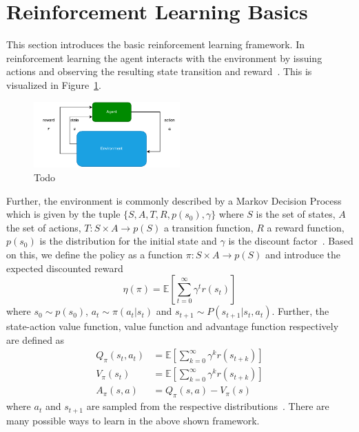 \section{Reinforcement Learning Basics}\label{sec:reinforcement-learning-basics}
This section introduces the basic reinforcement learning framework.
In reinforcement learning the agent interacts with the environment by issuing actions and observing
the resulting state transition and reward~\cite{Sutton1998}.
This is visualized in Figure~\ref{fig:RL_env}.
\begin{figure}[h]
    \centering
    \includegraphics[width=0.5\textwidth]{images/presentation/RL_env.pdf}
    \caption{Todo}
    \label{fig:RL_env}
\end{figure}
Further, the environment is commonly described by a Markov Decision Process which is given by the tuple
$\{S, A, T, R, p(s_0), \gamma\}$ where $S$ is the set of states, $A$ the set of actions, $T: S\times A\to p(S)$ a transition
function, $R$ a reward function, $p(s_0)$ is the distribution for the initial state and
$\gamma$ is the discount factor~\cite{Moerland2020}.
Based on this, we define the policy as a function $\pi: S\times A \to p(S)$ and introduce the expected discounted reward~\cite{Schulman2015TrustRP}
\begin{equation}
    \eta(\pi) = \mathbb{E}\left[ \sum_{t=0}^\infty \gamma^t r(s_t) \right]
\end{equation}
where $s_0\sim p(s_0)$, $a_t\sim\pi(a_t|s_t)$ and $s_{t+1} \sim P(s_{t+1} | s_t, a_t)$.
Further, the state-action value function, value function and advantage function respectively are defined as
\begin{align}
    Q_\pi(s_t, a_t) &= \mathbb{E}\left[ \sum_{k=0}^\infty \gamma^kr(s_{t+k}) \right]\\
    V_{\pi}(s_t) &= \mathbb{E}\left[ \sum_{k=0}^\infty \gamma^k r(s_{t+k})  \right]\\
    A_{\pi}(s, a) &= Q_{\pi}(s,a) - V_{\pi}(s)
    \label{eq:advantage_fc}
\end{align}
where $a_t$ and $s_{t+1}$ are sampled from the respective distributions~\cite{Schulman2015TrustRP}.
There are many possible ways to learn in the above shown framework.
